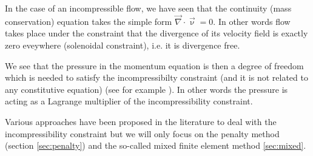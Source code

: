 
In the case of an incompressible flow, we have seen that the continuity (mass conservation)
equation takes the simple form ${\vec \nabla}\cdot{\vec \upnu}=0$. In other words flow takes place 
under the constraint that the divergence of its velocity field is exactly zero eveywhere 
(solenoidal constraint), i.e. it is divergence free. 

We see that the pressure in the momentum equation is then a degree of freedom which is needed 
to satisfy the incompressibilty constraint (and it is not related to any constitutive equation)
(see for example \textcite{dohu03}). In other words the pressure is acting as a Lagrange multiplier of the incompressibility
constraint. 

Various approaches have been proposed in the literature to deal with the 
incompressibility constraint but we will only focus on the penalty method 
(section \ref{sec:penalty}) and the so-called mixed finite element method
\ref{sec:mixed}.
